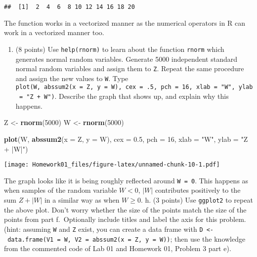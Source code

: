 \documentclass[]{article}
\newenvironment{Shaded}{\begin{snugshade}}{\end{snugshade}}
\newcommand{\DataTypeTok}[1]{\textcolor[rgb]{0.13,0.29,0.53}{#1}}
\newcommand{\DecValTok}[1]{\textcolor[rgb]{0.00,0.00,0.81}{#1}}
\newcommand{\FloatTok}[1]{\textcolor[rgb]{0.00,0.00,0.81}{#1}}
\newcommand{\KeywordTok}[1]{\textcolor[rgb]{0.13,0.29,0.53}{\textbf{#1}}}
\newcommand{\NormalTok}[1]{#1}
\newcommand{\StringTok}[1]{\textcolor[rgb]{0.31,0.60,0.02}{#1}}
\providecommand{\tightlist}{%
  \setlength{\itemsep}{0pt}\setlength{\parskip}{0pt}}
\begin{document}
\begin{verbatim}
##  [1]  2  4  6  8 10 12 14 16 18 20
\end{verbatim}

The function works in a vectorized manner as the numerical operators in
R can work in a vectorized manner too.

\begin{enumerate}
\def\labelenumi{\alph{enumi}.}
\setcounter{enumi}{6}
\tightlist
\item
  (8 points) Use \texttt{help(rnorm)} to learn about the function
  \texttt{rnorm} which generates normal random variables. Generate 5000
  independent standard normal random variables and assign them to
  \texttt{Z}. Repeat the same procedure and assign the new values to
  \texttt{W}. Type
  \texttt{plot(W,\ abssum2(x\ =\ Z,\ y\ =\ W),\ cex\ =\ .5,\ pch\ =\ 16,\ xlab\ =\ "W",\ ylab\ =\ "Z\ +\ \textbar{}W\textbar{}")}.
  Describe the graph that shows up, and explain why this happens.
\end{enumerate}

\begin{Shaded}
\begin{Highlighting}[]
\NormalTok{Z <-}\StringTok{ }\KeywordTok{rnorm}\NormalTok{(}\DecValTok{5000}\NormalTok{)}
\NormalTok{W <-}\StringTok{ }\KeywordTok{rnorm}\NormalTok{(}\DecValTok{5000}\NormalTok{)}

\KeywordTok{plot}\NormalTok{(W, }\KeywordTok{abssum2}\NormalTok{(}\DataTypeTok{x =}\NormalTok{ Z, }\DataTypeTok{y =}\NormalTok{ W),}
     \DataTypeTok{cex =} \FloatTok{0.5}\NormalTok{, }\DataTypeTok{pch =} \DecValTok{16}\NormalTok{, }\DataTypeTok{xlab =} \StringTok{"W"}\NormalTok{, }\DataTypeTok{ylab =} \StringTok{"Z + |W|"}\NormalTok{)}
\end{Highlighting}
\end{Shaded}

\texttt{[image: Homework01\_files/figure-latex/unnamed-chunk-10-1.pdf]}

The graph looks like it is being roughly reflected around
\texttt{W\ =\ 0}. This happens as when samples of the random variable
\(W < 0\), \(|W|\) contributes positively to the sum \(Z + |W|\) in a
similar way as when \(W \ge 0\). h. (3 points) Use \texttt{ggplot2} to
repeat the above plot. Don't worry whether the size of the points match
the size of the points from part f.~Optionally include titles and label
the axis for this problem. (hint: assuming \texttt{W} and \texttt{Z}
exist, you can create a data frame with
\texttt{D\ \textless{}-\ data.frame(V1\ =\ W,\ V2\ =\ abssum2(x\ =\ Z,\ y\ =\ W))};
then use the knowledge from the commented code of Lab 01 and Homework
01, Problem 3 part e).
\end{document}
